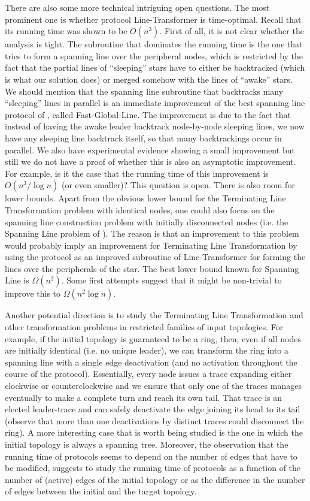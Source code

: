 \documentclass[preprint]{elsarticle}
\begin{document}
There are also some more technical intriguing open questions. The most prominent one is whether protocol Line-Transformer is time-optimal. Recall that its running time was shown to be $O(n^3)$. First of all, it is not clear whether the analysis is tight. The subroutine that dominates the running time is the one that tries to form a spanning line over the peripheral nodes, which is restricted by the fact that the partial lines of ``sleeping'' stars have to either be backtracked (which is what our solution does) or merged somehow with the lines of ``awake'' stars. We should mention that the spanning line subroutine that backtracks many ``sleeping'' lines in parallel is an immediate improvement of the best spanning line protocol of \cite{MS14}, called Fast-Global-Line. The improvement is due to the fact that instead of having the awake leader backtrack node-by-node sleeping lines, we now have any sleeping line backtrack itself, so that many backtrackings occur in parallel. We also have experimental evidence showing a small improvement \cite{ALMS15} but still we do not have a proof of whether this is also an asymptotic improvement. For example, is it the case that the running time of this improvement is $O(n^3/\log n)$ (or even smaller)? This question is open. There is also room for lower bounds. Apart from the obvious lower bound for the Terminating Line Transformation problem with identical nodes, one could also focus on the spanning line construction problem with initially disconnected nodes (i.e. the Spanning Line problem of \cite{MS14}). The reason is that an improvement to this problem would probably imply an improvement for Terminating Line Transformation by using the protocol as an improved subroutine of Line-Transformer for forming the lines over the peripherals of the star. The best lower bound known for Spanning Line is $\Omega(n^2)$. Some first attempts suggest that it might be non-trivial to improve this to $\Omega(n^2\log n)$. 

Another potential direction is to study the Terminating Line Transformation and other transformation problems in restricted families of input topologies. For example, if the initial topology is guaranteed to be a ring, then, even if all nodes are initially identical (i.e. no unique leader), we can transform the ring into a spanning line with a single edge deactivation (and no activation throughout the course of the protocol). Essentially, every node issues a trace expanding either clockwise or counterclockwise and we ensure that only one of the traces manages eventually to make a complete turn and reach its own tail. That trace is an elected leader-trace and can safely deactivate the edge joining its head to its tail (observe that more than one deactivations by distinct traces could disconnect the ring). A more interesting case that is worth being studied is the one in which the initial topology is always a spanning tree. Moreover, the observation that the running time of protocols seems to depend on the number of edges that have to be modified, suggests to study the running time of protocols as a function of the number of (active) edges of the initial topology or as the difference in the number of edges between the initial and the target topology.
\end{document}
